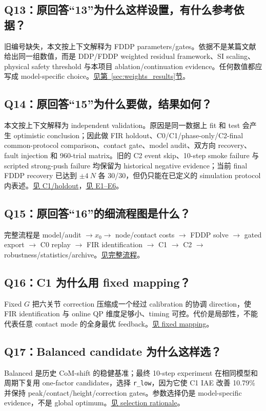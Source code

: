 \documentclass[UTF8,11pt,a4paper]{ctexart}
\newcommand{\code}[1]{\texttt{#1}}
\begin{document}
\subsection{Q13：原回答“13”为什么这样设置，有什么参考依据？}\label{q13}
旧编号缺失，本文按上下文解释为 FDDP parameters/gates。依据不是某篇文献给出同一组数值，而是 DDP/FDDP weighted residual framework、SI scaling、physical safety threshold 与本项目 ablation/continuation evidence。任何数值都应写成 model-specific choice。\hyperref[sec:weights_results]{见第~\ref*{sec:weights_results}节}。

\subsection{Q14：原回答“15”为什么要做，结果如何？}\label{q14}
本文按上下文解释为 independent validation。原因是同一数据上 fit 和 test 会产生 optimistic conclusion；因此做 FIR holdout、C0/C1/phase-only/C2-final common-protocol comparison、contact gate、model audit、双方向 recovery、fault injection 和 960-trial matrix。旧的 C2 event skip、10-step smoke failure 与 scripted strong-push failure 均保留为 historical negative evidence；当前 final FDDP recovery 已达到 $\pm\SI{4}{N}$ 各 30/30，但仍只能在已定义的 simulation protocol 内表述。\hyperref[sec:balanced]{见 C1/holdout}，\hyperref[sec:evidence]{见 E1--E6}。

\subsection{Q15：原回答“16”的细流程图是什么？}\label{q15}
完整流程是 model/audit $\rightarrow x_0\rightarrow$ node/contact costs $\rightarrow$ FDDP solve $\rightarrow$ gated export $\rightarrow$ C0 replay $\rightarrow$ FIR identification $\rightarrow$ C1 $\rightarrow$ C2 $\rightarrow$ robustness/statistics/archive。\hyperref[sec:pipeline]{见完整流程}。

\subsection{Q16：C1 为什么用 fixed mapping？}\label{q16}
Fixed $G$ 把六关节 correction 压缩成一个经过 calibration 的协调 direction，使 FIR identification 与 online QP 维度足够小、timing 可控。代价是局部性，不能代表任意 contact mode 的全身最优 feedback。\hyperref[sec:mapping]{见 fixed mapping}。

\subsection{Q17：Balanced candidate 为什么这样选？}\label{q17}
Balanced 是历史 CoM-shift 的稳健基准；最终 10-step experiment 在相同模型和周期下复用 one-factor candidates，选择 \code{r\_low}，因为它使 C1 IAE 改善 10.79\% 并保持 peak/contact/height/correction gates。参数选择仍是 model-specific evidence，不是 global optimum。\hyperref[sec:balanced]{见 selection rationale}。
\end{document}
